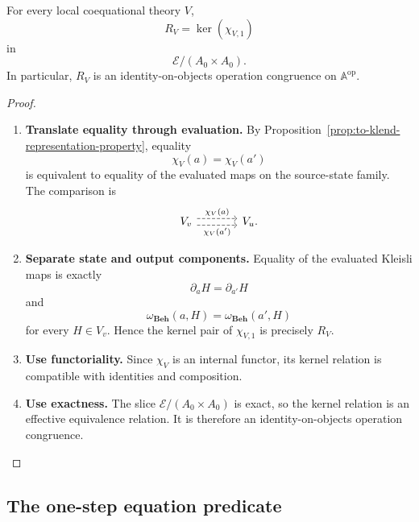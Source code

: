 \begin{theorem}
\label{thm:to-valid-equations-kernel-congruence}
    For every local coequational theory \(V\),
    \[
        R_V
        =
        \ker(\chi_{V,1})
    \]
    in
    \[
        \mathcal E/(A_0\times A_0).
    \]
    In particular, \(R_V\) is an identity-on-objects operation congruence on
    \(\mathbb A^{\mathrm{op}}\).
\end{theorem}

\begin{proof}
    \leavevmode
    \begin{enumerate}
        \item \textbf{Translate equality through evaluation.}
        By Proposition~\ref{prop:to-klend-representation-property}, equality
        \[
            \chi_V(a)=\chi_V(a')
        \]
        is equivalent to equality of the evaluated maps on the source-state
        family. The comparison is
        \[
        \begin{tikzcd}[column sep=large]
            V_v
                \arrow[r, shift left=.7ex, dashed, "\chi_V(a)"]
                \arrow[r, shift right=.7ex, dashed, "\chi_V(a')"']
            &
            V_u.
        \end{tikzcd}
        \]

        \item \textbf{Separate state and output components.}
        Equality of the evaluated Kleisli maps is exactly
        \[
            \partial_aH=\partial_{a'}H
        \]
        and
        \[
            \omega_{\mathbf{Beh}}(a,H)
            =
            \omega_{\mathbf{Beh}}(a',H)
        \]
        for every \(H\in V_v\). Hence the kernel pair of \(\chi_{V,1}\) is
        precisely \(R_V\).

        \item \textbf{Use functoriality.}
        Since \(\chi_V\) is an internal functor, its kernel relation is
        compatible with identities and composition.

        \item \textbf{Use exactness.}
        The slice \(\mathcal E/(A_0\times A_0)\) is exact, so the kernel
        relation is an effective equivalence relation. It is therefore an
        identity-on-objects operation congruence.
    \end{enumerate}
\end{proof}

\subsection{The one-step equation predicate}
\label{subsec:to-one-step-equation-predicate}

